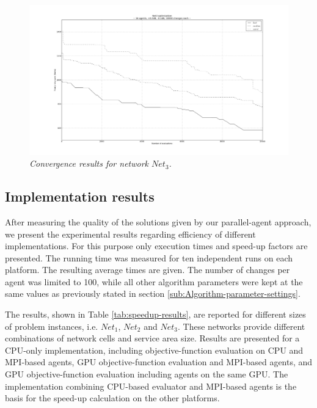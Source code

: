 \begin{figure}
\centering

\includegraphics[width=1\textwidth]{06-experimental_evaluation-service_coverage/img/convergence_3}

\caption{\textit{Convergence results for network $Net_{3}$.\label{fig:convergence_net3}}}
\end{figure}



\subsection{Implementation results}

After measuring the quality of the solutions given by our parallel-agent
approach, we present the experimental results regarding efficiency
of different implementations. For this purpose only execution times
and speed-up factors are presented. The running time was measured
for ten independent runs on each platform. The resulting average times
are given. The number of changes per agent was limited to 100, while
all other algorithm parameters were kept at the same values as previously
stated in section \ref{sub:Algorithm-parameter-settings}.

The results, shown in Table \ref{tab:speedup-results}, are reported
for different sizes of problem instances, i.e. $Net_{1}$, $Net_{2}$
and $Net_{3}$. These networks provide different combinations of network
cells and service area size. Results are presented for a CPU-only
implementation, including objective-function evaluation on CPU and
MPI-based agents, GPU objective-function evaluation and MPI-based
agents, and GPU objective-function evaluation including agents on
the same GPU. The implementation combining CPU-based evaluator and
MPI-based agents is the basis for the speed-up calculation on the
other platforms.

